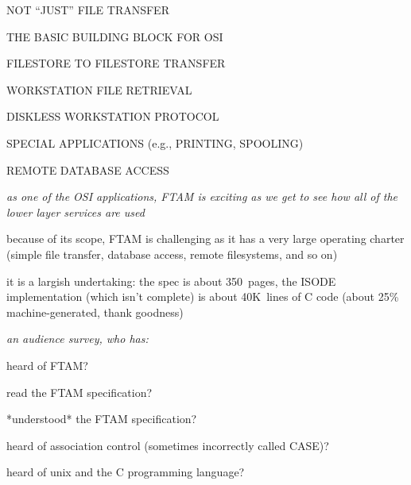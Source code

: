 \begin{bwslide}

\begin{nrtc}
\item	NOT ``JUST'' FILE TRANSFER

\item	THE BASIC BUILDING BLOCK FOR OSI
    \begin{nrtc}
    \item	FILESTORE TO FILESTORE TRANSFER

    \item	WORKSTATION FILE RETRIEVAL

    \item	DISKLESS WORKSTATION PROTOCOL

    \item	SPECIAL APPLICATIONS (e.g., PRINTING, SPOOLING)

    \item	REMOTE DATABASE ACCESS
    \end{nrtc}
\end{nrtc}
\end{bwslide}


\begin{note}\em
as one of the OSI applications,
FTAM is exciting
as we get to see how all of the lower layer services are used

because of its scope,
FTAM is challenging
as it has a very large operating charter
(simple file transfer, database access, remote filesystems, and so on)

it is a largish undertaking:
the spec is about 350~pages,
the ISODE implementation (which isn't complete) is about 40K~lines of C code
(about 25\% machine-generated, thank goodness)
\end{note}


\begin{note}\em
an audience survey, who has:

heard of FTAM?

read the FTAM specification?

*understood* the FTAM specification?

heard of association control (sometimes incorrectly called CASE)?

heard of unix and the C programming language?
\end{note}


